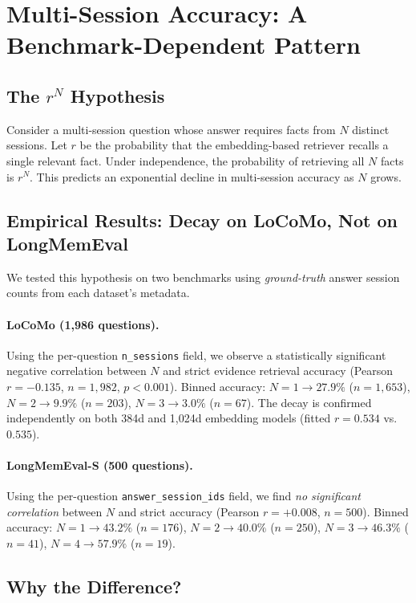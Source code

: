 \documentclass{article}
\begin{document}
\section{Multi-Session Accuracy: A Benchmark-Dependent Pattern}
\label{sec:rn}

\subsection{The $r^N$ Hypothesis}

Consider a multi-session question whose answer requires facts from $N$ distinct sessions. Let $r$ be the probability that the embedding-based retriever recalls a single relevant fact. Under independence, the probability of retrieving all $N$ facts is $r^N$. This predicts an exponential decline in multi-session accuracy as $N$ grows.

\subsection{Empirical Results: Decay on LoCoMo, Not on LongMemEval}

We tested this hypothesis on two benchmarks using \emph{ground-truth} answer session counts from each dataset's metadata.

\paragraph{LoCoMo (1{,}986 questions).}
Using the per-question \texttt{n\_sessions} field, we observe a statistically significant negative correlation between $N$ and strict evidence retrieval accuracy (Pearson $r = -0.135$, $n = 1{,}982$, $p < 0.001$). Binned accuracy: $N{=}1 \to 27.9\%$ ($n{=}1{,}653$), $N{=}2 \to 9.9\%$ ($n{=}203$), $N{=}3 \to 3.0\%$ ($n{=}67$). The decay is confirmed independently on both 384d and 1{,}024d embedding models (fitted $r = 0.534$ vs.\ $0.535$).

\paragraph{LongMemEval-S (500 questions).}
Using the per-question \texttt{answer\_session\_ids} field, we find \emph{no significant correlation} between $N$ and strict accuracy (Pearson $r = +0.008$, $n = 500$). Binned accuracy: $N{=}1 \to 43.2\%$ ($n{=}176$), $N{=}2 \to 40.0\%$ ($n{=}250$), $N{=}3 \to 46.3\%$ ($n{=}41$), $N{=}4 \to 57.9\%$ ($n{=}19$).

\subsection{Why the Difference?}
\end{document}
